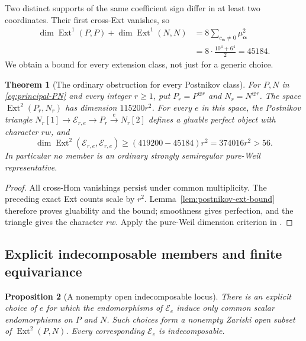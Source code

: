 \documentclass[11pt]{article}
\makeatletter
\providecommand{\compref}[1]{\csname external@#1\endcsname}
\newtheorem{theorem}{Theorem}[section]
\newtheorem{proposition}[theorem]{Proposition}
\theoremstyle{definition}
\theoremstyle{remark}
\makeatother
\begin{document}
Two distinct supports of the same coefficient sign differ in
at least two coordinates.  Their first cross-Ext vanishes, so
\[
 \begin{split}
 \dim\operatorname{Ext}^1(P,P)
 +\dim\operatorname{Ext}^1(N,N)
 &=8\sum_{c_{\boldsymbol\alpha}\ne0}\mu_{\boldsymbol\alpha}^2\\
 &=8\cdot\frac{10^4+6^4}{2}=45184.
 \end{split}
\]
We obtain a bound for every extension class, not just for a
generic choice.

\begin{theorem}[The ordinary obstruction for every Postnikov class]
\label{thm:principal-postnikov-ordinary}
For $P,N$ in \eqref{eq:principal-PN} and every integer $r\geq1$,
put $P_r=P^{\oplus r}$ and $N_r=N^{\oplus r}$.
The space $\operatorname{Ext}^2(P_r,N_r)$ has dimension $115200r^2$.
For every $e$ in this space, the Postnikov triangle
$N_r[1]\to\mathcal E_{r,e}\to P_r\xrightarrow eN_r[2]$
defines a gluable perfect object with character $rw$, and
\begin{equation}
 \label{eq:principal-postnikov-bound}
 \dim\operatorname{Ext}^2(\mathcal E_{r,e},\mathcal E_{r,e})
 \geq(419200-45184)r^2=374016r^2>56.
\end{equation}
In particular no member is an ordinary strongly semiregular
pure-Weil representative.
\end{theorem}

\begin{proof}
All cross-Hom vanishings persist under common multiplicity.
The preceding exact Ext counts scale by $r^2$.
Lemma~\ref{lem:postnikov-ext-bound} therefore proves gluability and
the bound; smoothness gives perfection, and the triangle gives
the character $rw$.  Apply the pure-Weil dimension
criterion in \cite[Theorem~\compref{thm:pure-weil-ext}]{CompanionA}.
\end{proof}

\subsection{Explicit indecomposable members and finite equivariance}

\begin{proposition}[A nonempty open indecomposable locus]
\label{prop:principal-postnikov-indecomposable}
There is an explicit choice of $e$ for which the endomorphisms of
$\mathcal E_e$ induce only common scalar endomorphisms on $P$ and
$N$.  Such choices form a nonempty Zariski open subset of
$\operatorname{Ext}^2(P,N)$.  Every corresponding
$\mathcal E_e$ is indecomposable.
\end{proposition}
\end{document}
